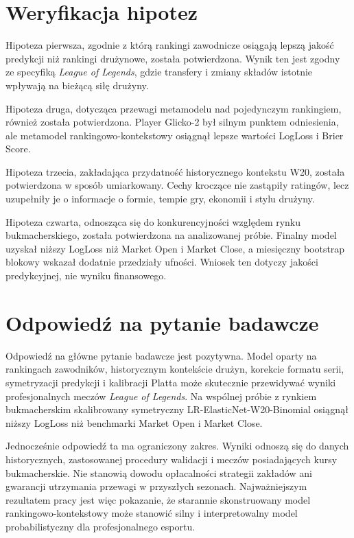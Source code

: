 \section{Weryfikacja hipotez}

Hipoteza pierwsza, zgodnie z którą rankingi zawodnicze osiągają lepszą jakość predykcji niż rankingi drużynowe, została potwierdzona. Wynik ten jest zgodny ze specyfiką \textit{League of Legends}, gdzie transfery i zmiany składów istotnie wpływają na bieżącą siłę drużyny.

Hipoteza druga, dotycząca przewagi metamodelu nad pojedynczym rankingiem, również została potwierdzona. Player Glicko-2 był silnym punktem odniesienia, ale metamodel rankingowo-kontekstowy osiągnął lepsze wartości LogLoss i Brier Score.

Hipoteza trzecia, zakładająca przydatność historycznego kontekstu W20, została potwierdzona w sposób umiarkowany. Cechy kroczące nie zastąpiły ratingów, lecz uzupełniły je o informacje o formie, tempie gry, ekonomii i stylu drużyny.

Hipoteza czwarta, odnosząca się do konkurencyjności względem rynku bukmacherskiego, została potwierdzona na analizowanej próbie. Finalny model uzyskał niższy LogLoss niż Market Open i Market Close, a miesięczny bootstrap blokowy wskazał dodatnie przedziały ufności. Wniosek ten dotyczy jakości predykcyjnej, nie wyniku finansowego.

\section{Odpowiedź na pytanie badawcze}

Odpowiedź na główne pytanie badawcze jest pozytywna. Model oparty na rankingach zawodników, historycznym kontekście drużyn, korekcie formatu serii, symetryzacji predykcji i kalibracji Platta może skutecznie przewidywać wyniki profesjonalnych meczów \textit{League of Legends}. Na wspólnej próbie z rynkiem bukmacherskim skalibrowany symetryczny LR-ElasticNet-W20-Binomial osiągnął niższy LogLoss niż benchmarki Market Open i Market Close.

Jednocześnie odpowiedź ta ma ograniczony zakres. Wyniki odnoszą się do danych historycznych, zastosowanej procedury walidacji i meczów posiadających kursy bukmacherskie. Nie stanowią dowodu opłacalności strategii zakładów ani gwarancji utrzymania przewagi w przyszłych sezonach. Najważniejszym rezultatem pracy jest więc pokazanie, że starannie skonstruowany model rankingowo-kontekstowy może stanowić silny i interpretowalny model probabilistyczny dla profesjonalnego esportu.
